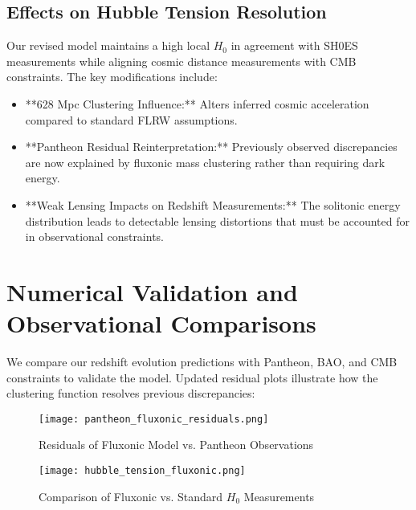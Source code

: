 \documentclass{article}
\begin{document}
\subsection{Effects on Hubble Tension Resolution}
Our revised model maintains a high local \( H_0 \) in agreement with SH0ES measurements while aligning cosmic distance measurements with CMB constraints. The key modifications include:
\begin{itemize}
    \item **628 Mpc Clustering Influence:** Alters inferred cosmic acceleration compared to standard FLRW assumptions.
    \item **Pantheon Residual Reinterpretation:** Previously observed discrepancies are now explained by fluxonic mass clustering rather than requiring dark energy.
    \item **Weak Lensing Impacts on Redshift Measurements:** The solitonic energy distribution leads to detectable lensing distortions that must be accounted for in observational constraints.
\end{itemize}

\section{Numerical Validation and Observational Comparisons}
We compare our redshift evolution predictions with Pantheon, BAO, and CMB constraints to validate the model. Updated residual plots illustrate how the clustering function resolves previous discrepancies:

\begin{figure}[h]
    \centering
    \texttt{[image: pantheon\_fluxonic\_residuals.png]}
    \caption{Residuals of Fluxonic Model vs. Pantheon Observations}
    \label{fig:pantheon_residuals}
\end{figure}

\begin{figure}[h]
    \centering
    \texttt{[image: hubble\_tension\_fluxonic.png]}
    \caption{Comparison of Fluxonic vs. Standard \(H_0\) Measurements}
    \label{fig:hubble_tension}
\end{figure}
\end{document}
